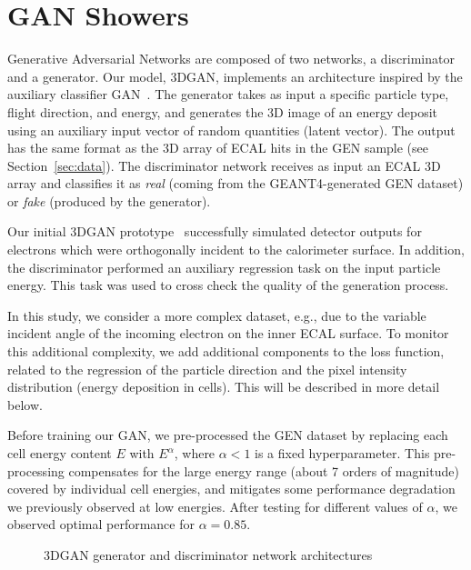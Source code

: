 \chapter{GAN Showers}\label{sec:GAN}

Generative Adversarial Networks are composed of two networks, a discriminator and a generator. Our model, 3DGAN, implements an architecture inspired by the auxiliary classifier GAN~\cite{acgan}. The generator takes as input a specific particle type, flight direction, and energy, and generates the 3D image of an energy deposit using an auxiliary input vector of random quantities (latent vector). 
The output has the same format as the 3D array of ECAL hits in the GEN sample (see Section~\ref{sec:data}). The discriminator network receives as input an ECAL 3D array and classifies it as {\it real} (coming from the GEANT4-generated GEN dataset) or {\it fake} (produced by the generator).

 Our initial 3DGAN prototype~\cite{NIPS} successfully simulated detector outputs for electrons which were orthogonally incident to the calorimeter surface. In addition, the discriminator performed an auxiliary regression task on the input particle energy. This task was used to cross check the quality of the generation process. 
 
 In this study, we consider a more complex dataset, e.g., due to the variable incident angle of the incoming electron on the inner ECAL surface. To monitor this additional complexity, we add additional components to the loss function, related to the regression of the particle direction and the pixel intensity distribution (energy deposition in cells). This will be described in more detail below.

Before training our GAN, we pre-processed the GEN dataset by replacing each cell energy content $E$ with $E^\alpha$, where $\alpha<1$ is a fixed hyperparameter. This pre-processing compensates for the large energy range (about 7 orders of magnitude) covered by individual cell energies, and mitigates some performance degradation we previously observed at low energies. After testing for different values of $\alpha$, we observed optimal performance for $\alpha=0.85$.

\begin{figure*}[htbp]
\centering
    \caption{3DGAN generator and discriminator network architectures}
    \label{fig:GAN_arch}
\end{figure*}

